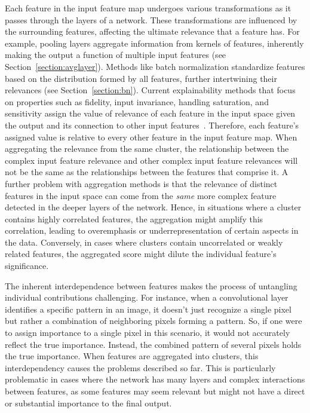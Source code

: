 Each feature in the input feature map undergoes various transformations as it passes through the layers of a network. These transformations are influenced by the surrounding features, affecting the ultimate relevance that a feature has. For example, pooling layers aggregate information from kernels of features, inherently making the output a function of multiple input features (see Section~\ref{section:avglayer}). Methods like batch normalization standardize features based on the distribution formed by all features, further intertwining their relevances (see Section~\ref{section:bn}). Current explainability methods that focus on properties such as fidelity, input invariance, handling saturation, and sensitivity assign the value of relevance of each feature in the input space given the output and its connection to other input features~\cite{SimonyanVZ13, SpringenbergDBR14, bach2015pixel, SelvarajuCDVPB20, ChattopadhyaySH18, abs-1908-01224, SmilkovTKVW17}. Therefore, each feature's assigned value is relative to every other feature in the input feature map. When aggregating the relevance from the same cluster, the relationship between the complex input feature relevance and other complex input feature relevances will not be the same as the relationships between the features that comprise it. A further problem with aggregation methods is that the relevance of distinct features in the input space can come from the \emph{same} more complex feature detected in the deeper layers of the network. Hence, in situations where a cluster contains highly correlated features, the aggregation might amplify this correlation, leading to overemphasis or underrepresentation of certain aspects in the data. Conversely, in cases where clusters contain uncorrelated or weakly related features, the aggregated score might dilute the individual feature's significance.

The inherent interdependence between features makes the process of untangling individual contributions challenging. For instance, when a convolutional layer identifies a specific pattern in an image, it doesn't just recognize a single pixel but rather a combination of neighboring pixels forming a pattern. So, if one were to assign importance to a single pixel in this scenario, it would not accurately reflect the true importance. Instead, the combined pattern of several pixels holds the true importance. When features are aggregated into clusters, this interdependency causes the problems described so far. This is particularly problematic in cases where the network has many layers and complex interactions between features, as some features may seem relevant but might not have a direct or substantial importance to the final output.


